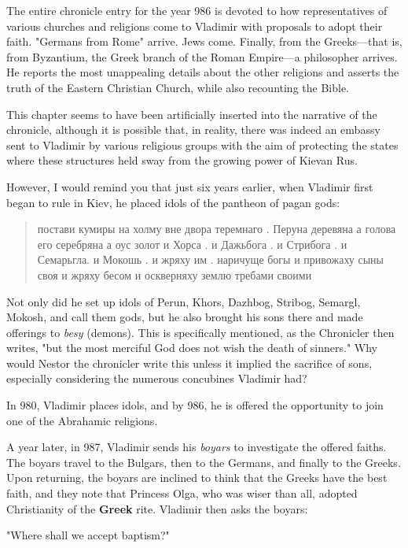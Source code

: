 \documentclass[a5paper,11pt,openany]{article}
\begin{document}
The entire chronicle entry for the year 986 is devoted to how representatives of various churches and religions come to Vladimir with proposals to adopt their faith. "Germans from Rome" arrive. Jews come. Finally, from the Greeks—that is, from Byzantium, the Greek branch of the Roman Empire—a philosopher arrives. He reports the most unappealing details about the other religions and asserts the truth of the Eastern Christian Church, while also recounting the Bible.

This chapter seems to have been artificially inserted into the narrative of the chronicle, although it is possible that, in reality, there was indeed an embassy sent to Vladimir by various religious groups with the aim of protecting the states where these structures held sway from the growing power of Kievan Rus.

However, I would remind you that just six years earlier, when Vladimir first began to rule in Kiev, he placed idols of the pantheon of pagan gods:

\begin{quotation}
\noindent постави кумиры на холму вне двора теремнаго . Перуна деревяна а голова его серебряна а оус золот и Хорса . и Дажьбога . и Стрибога . и Семарьгла. и Мокошь . и жряху им . наричуще богы и привожаху сыны своя и жряху бесом и оскверняху землю требами своими
\end{quotation}

Not only did he set up idols of Perun, Khors, Dazhbog, Stribog, Semargl, Mokosh, and call them gods, but he also brought his sons there and made offerings to \textit{besy} (demons). This is specifically mentioned, as the Chronicler then writes, "but the most merciful God does not wish the death of sinners." Why would Nestor the chronicler write this unless it implied the sacrifice of sons, especially considering the numerous concubines Vladimir had?

In 980, Vladimir places idols, and by 986, he is offered the opportunity to join one of the Abrahamic religions.

A year later, in 987, Vladimir sends his \textit{boyars} to investigate the offered faiths. The boyars travel to the Bulgars, then to the Germans, and finally to the Greeks. Upon returning, the boyars are inclined to think that the Greeks have the best faith, and they note that Princess Olga, who was wiser than all, adopted Christianity of the \textbf{Greek} rite. Vladimir then asks the boyars:

 "Where shall we accept baptism?"
\end{document}
